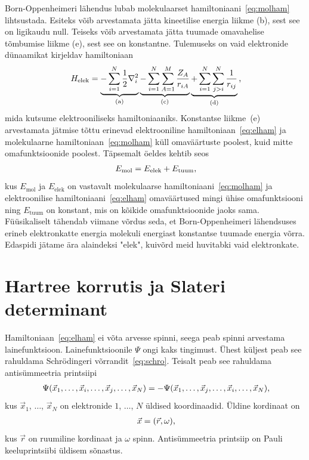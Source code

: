 \documentclass[12pt]{report}
\begin{document}
Born-Oppenheimeri lähendus lubab molekulaarset hamiltoniaani~\eqref{eq:molham} lihtsustada.
Esiteks võib arvestamata jätta kineetilise energia liikme (b), sest see on ligikaudu null.
Teiseks võib arvestamata jätta tuumade omavahelise tõmbumise liikme (e), sest see on konstantne.
Tulemuseks on vaid elektronide dünaamikat kirjeldav hamiltoniaan
\begin{align}\label{eq:elham}
    H_\text{elek} =
    \underbrace{- \sum_{i = 1}^N \frac{1}{2} \nabla_i^2}_\text{(a)}
    \underbrace{- \sum_{i = 1}^N \sum_{A = 1}^M \frac{Z_A}{r_{iA}}}_\text{(c)}
    \underbrace{+ \sum_{i = 1}^N \sum_{j > i}^N \frac{1}{r_{ij}}}_\text{(d)} \rlap{,}
\end{align}
mida kutsume elektrooniliseks hamiltoniaaniks.
Konstantse liikme~(e) arvestamata jätmise tõttu erinevad elektrooniline hamiltoniaan~\eqref{eq:elham} ja molekulaarne hamiltoniaan~\eqref{eq:molham} küll omaväärtuste poolest, kuid mitte omafunktsioonide poolest.
Täpsemalt öeldes kehtib seos
\begin{align}\label{eq:eigenelvsmol}
    E_\text{mol} = E_\text{elek} + E_\text{tuum} \rlap{,}
\end{align}
kus \(E_\text{mol}\) ja \(E_\text{elek}\) on vastavalt molekulaarse hamiltoniaani~\eqref{eq:molham} ja elektroonilise hamiltoniaani~\eqref{eq:elham} omaväärtused mingi ühise omafunktsiooni ning \(E_\text{tuum}\) on konstant, mis on kõikide omafunktsioonide jaoks sama.
Füüsikaliselt tähendab viimane võrdus seda, et Born-Oppenheimeri lähendsuses erineb elektronkatte energia molekuli energiast konstantse tuumade energia võrra.
Edaspidi jätame ära alaindeksi "elek", kuivõrd meid huvitabki vaid elektronkate.

\section{Hartree korrutis ja Slateri determinant}\label{sec:hpsd}

Hamiltoniaan~\eqref{eq:elham} ei võta arvesse spinni, seega peab spinni arvestama lainefunktsioon.
Lainefunktsioonile \(\Psi\) ongi kaks tingimust.
Ühest küljest peab see rahuldama Schrödingeri võrrandit~\eqref{eq:schro}.
Teisalt peab see rahuldama antisümmeetria printsiipi
\begin{align}\label{eq:antisim}
    \Psi(\vec{x}_1, \ldots, \vec{x}_i, \ldots, \vec{x}_j, \ldots, \vec{x}_N) =
    -\Psi(\vec{x}_1, \ldots, \vec{x}_j, \ldots, \vec{x}_i, \ldots, \vec{x}_N) \rlap{,}
\end{align}
kus \(\vec{x}_1\), \(\ldots\), \(\vec{x}_N\) on elektronide \(1\), \(\ldots\), \(N\) üldised koordinaadid.
Üldine kordinaat on
\begin{align}
    \vec{x} = (\vec{r}, \omega) \rlap{,}
\end{align}
kus \(\vec{r}\) on ruumiline kordinaat ja \(\omega\) spinn.
Antisümmeetria printsiip on Pauli keeluprintsiibi üldisem sõnastus.
\end{document}

